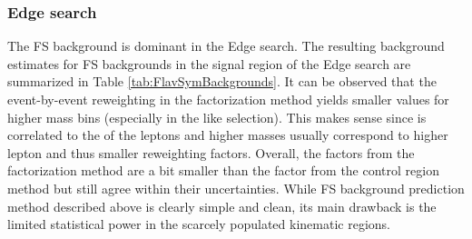 \subsubsection*{Edge search}
\noindent\justify
The FS background is dominant in the Edge search.
The resulting background estimates for FS backgrounds in the signal region of the Edge search are summarized in Table \ref{tab:FlavSymBackgrounds}.
It can be observed that the event-by-event reweighting in the factorization method yields smaller \Rsfof values for higher mass bins (especially in the \ttbar like selection).
This makes sense since \mll is correlated to the \pt of the leptons and higher masses usually correspond to higher lepton \pt and thus smaller reweighting factors.
Overall, the \Rsfof factors from the factorization method are a bit smaller than the factor from the control region method but still agree within their uncertainties.
While FS background prediction method described above is clearly simple and clean, its main drawback is the limited statistical power in the scarcely populated kinematic regions.
